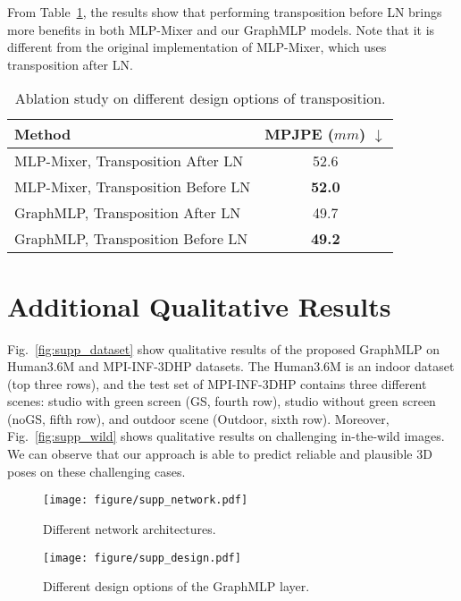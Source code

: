 \documentclass[lettersize,journal]{IEEEtran}
\begin{document}
From Table~\ref{table:transposition}, the results show that performing transposition before LN brings more benefits in both MLP-Mixer and our GraphMLP models. 
Note that it is different from the original implementation of MLP-Mixer, which uses transposition after LN. 

\begin{table}[!t]
  \centering
  \scriptsize
  \caption
  {Ablation study on different design options of transposition. 
  }
  \setlength{\tabcolsep}{5.30mm}
  \begin{tabular}{lc}
  \toprule
  Method &MPJPE ($mm$) $\downarrow$ \\
  \midrule
  MLP-Mixer, Transposition After LN &52.6 \\
  MLP-Mixer, Transposition Before LN &\textbf{52.0} \\

  \midrule
  GraphMLP, Transposition After LN &49.7 \\
  GraphMLP, Transposition Before LN &\textbf{49.2} \\

  \toprule
  \end{tabular}
  \label{table:transposition}
\end{table}

\section{Additional Qualitative Results}
\label{sec:qualitative}
Fig.~\ref{fig:supp_dataset} show qualitative results of the proposed GraphMLP on Human3.6M and MPI-INF-3DHP datasets. 
The Human3.6M is an indoor dataset (top three rows), and the test set of MPI-INF-3DHP contains three different scenes: studio with green screen (GS, fourth row), studio without green screen (noGS, fifth row), and outdoor scene (Outdoor, sixth row). 
Moreover, Fig.~\ref{fig:supp_wild} shows qualitative results on challenging in-the-wild images. 
We can observe that our approach is able to predict reliable and plausible 3D poses on these challenging cases. 

\begin{figure*}[b]
  \centering
  \texttt{[image: figure/supp\_network.pdf]}
  \caption
  { 
    Different network architectures. 
  }
  \label{fig:supp_network}
\end{figure*}

\begin{figure*}[t]
  \centering
  \texttt{[image: figure/supp\_design.pdf]}
  \caption
  {
    Different design options of the GraphMLP layer. 
  }
  \label{fig:supp_design}
\end{figure*}
\end{document}
